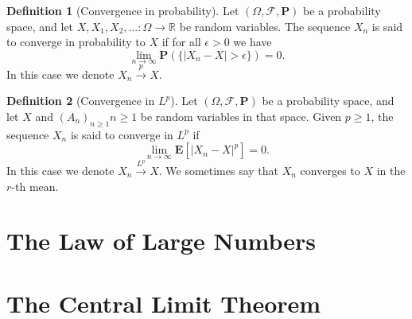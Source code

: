 \documentclass[11pt,a4paper]{article}
\theoremstyle{definition}
\newtheorem{definition}{Definition}[section]
\theoremstyle{plain}
\newcommand{\R}{\mathbb{R}}
\newcommand{\E}{\mathbf{E}}
\newcommand{\Prob}{\mathbf{P}}
\newcommand{\abs}[1]{\left\lvert #1\right\rvert}
\begin{document}
  \begin{definition}[Convergence in probability]
    Let $(\Omega, \mathcal F, \Prob)$ be a probability space, and let
    $X,X_1,X_2,\dots \colon \Omega \to \R$ be random variables.
    The sequence $X_n$ is said to converge in probability to $X$ if
    for all $\epsilon > 0$ we have
    \[
      \lim_{n \to \infty}
      \Prob\left(\{\abs{X_n - X} > \epsilon\}\right) = 0.
    \]
    In this case we denote $X_n \xrightarrow{p} X$.
  \end{definition}

  \begin{definition}[Convergence in $L^p$]
    Let $(\Omega, \mathcal F, \Prob)$ be a probability space, and let
    $X$ and $(A_n)_{n \geq 1}n \geq 1$ be random variables in that space.
    Given $p \geq 1$, the sequence $X_n$ is said to converge in $L^p$
    if
    \[
      \lim_{n \to \infty} \E\left[\abs{X_n - X}^p\right] = 0.
    \]
    In this case we denote $X_n \xrightarrow{L^p} X$.
    We sometimes say that $X_n$ converges to $X$ in the $r$-th mean.
  \end{definition}
  



  \section{The Law of Large Numbers}

  \section{The Central Limit Theorem}
\end{document}
